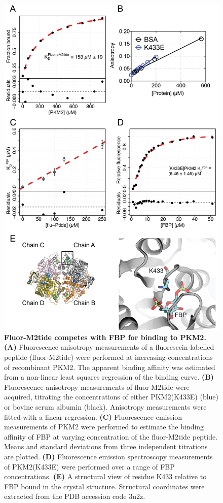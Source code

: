 \begin{figure}[!ht]
\includegraphics[scale=0.6]{ch4_fig4_peptide_binding.png}
\caption[Fluor-M2tide competes with FBP for binding to PKM2.] {\textbf{Fluor-M2tide competes with FBP for binding to PKM2.} \textbf{(A)} Fluorescence anisotropy measurements of a fluorescein-labelled peptide (fluor-M2tide) were performed at increasing concentrations of recombinant PKM2. The apparent binding affinity was estimated from a non-linear least squares regression of the binding curve. \textbf{(B)} Fluorescence anisotropy measurements of fluor-M2tide were acquired, titrating the concentrations of either PKM2(K433E) (blue) or bovine serum albumin (black). Anisotropy measurements were fitted with a linear regression. \textbf{(C)} Fluorescence emission measurements of PKM2 were performed to estimate the binding affinity of FBP at varying concentration of the fluor-M2tide peptide. Means and standard deviations from three independent titrations are plotted. \textbf{(D)} Fluorescence emission spectroscopy measurements of PKM2(K433E) were performed over a range of FBP concentrations. \textbf{(E)} A structural view of residue K433 relative to FBP bound in the crystal structure. Structural coordinates were extracted from the PDB accession code 3u2z.}
\label{fig:peptide_binding}
\end{figure}
%
%
\clearpage

